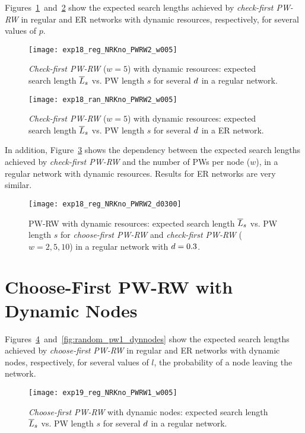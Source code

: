\documentclass[]{elsarticle}
\newcommand{\s}		{\ensuremath{s}}		\newcommand{\sopt}	{\ensuremath{s_{opt}}}		\newcommand{\p}		{\ensuremath{p}}		\newcommand{\W}		{\ensuremath{W}}		\newcommand{\w}		{\ensuremath{w}}		\newcommand{\lsave}	{\ensuremath{\overline{l}_s}}	\newcommand{\lave}	{\ensuremath{\overline{l}}}	\newcommand{\lopt}	{\ensuremath{\overline{l}_{opt}}}
\begin{document}
Figures~\ref{fig:regular_pw2}~and~\ref{fig:random_pw2} show the expected search lengths achieved by \emph{check-first PW-RW} in regular and ER networks with dynamic resources, respectively, for several values of $p$.

\begin{figure}[h]
 \centering
 \texttt{[image: exp18\_reg\_NRKno\_PWRW2\_w005]}
 \caption{\emph{Check-first PW-RW} ($\w=5$) with dynamic resources: expected search length $\overline{L}_s$ vs. PW length $\s$ for several $d$ in a regular network.}
 \label{fig:regular_pw2}
\end{figure}

\begin{figure}[h]
 \centering
 \texttt{[image: exp18\_ran\_NRKno\_PWRW2\_w005]}
 \caption{\emph{Check-first PW-RW} ($\w=5$) with dynamic resources: expected search length $\overline{L}_s$ vs. PW length $\s$ for several $d$ in a ER network.}
 \label{fig:random_pw2}
\end{figure}

In addition, Figure~\ref{fig:regular_pw1_pw2} shows the dependency between the expected search lengths achieved by \emph{check-first PW-RW} and the number of PWs per node ($w$), in a regular network with dynamic resources. Results for ER networks are very similar.

\begin{figure}[h]
 \centering
 \texttt{[image: exp18\_reg\_NRKno\_PWRW2\_d0300]}
 \caption{PW-RW with dynamic resources: expected search length $\overline{L}_s$ vs. PW length $\s$ for \emph{choose-first PW-RW} and \emph{check-first PW-RW} ($\w = 2, 5, 10$) in a regular network with $d=0.3$.}
 \label{fig:regular_pw1_pw2}
\end{figure}

\section{Choose-First PW-RW with Dynamic Nodes}

Figures~\ref{fig:regular_pw1_dynnodes}~and~\ref{fig:random_pw1_dynnodes} show the expected search lengths achieved by \emph{choose-first PW-RW} in regular and ER networks with dynamic nodes, respectively, for several values of $l$, the probability of a node leaving the network.

\begin{figure}[h]
 \centering
 \texttt{[image: exp19\_reg\_NRKno\_PWRW1\_w005]}
 \caption{\emph{Choose-first PW-RW} with dynamic nodes: expected search length $\overline{L}_s$ vs. PW length $\s$ for several $d$ in a regular network.}
 \label{fig:regular_pw1_dynnodes}
\end{figure}
\end{document}
